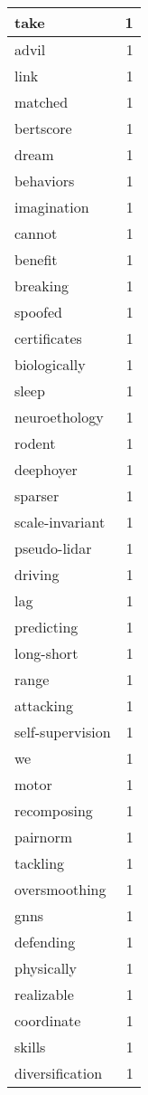 \begin{table}[h]
\begin{tabular}{|l|r|}
\hline
take & 1 \\
\hline
advil & 1 \\
\hline
link & 1 \\
\hline
matched & 1 \\
\hline
bertscore & 1 \\
\hline
dream & 1 \\
\hline
behaviors & 1 \\
\hline
imagination & 1 \\
\hline
cannot & 1 \\
\hline
benefit & 1 \\
\hline
breaking & 1 \\
\hline
spoofed & 1 \\
\hline
certificates & 1 \\
\hline
biologically & 1 \\
\hline
sleep & 1 \\
\hline
neuroethology & 1 \\
\hline
rodent & 1 \\
\hline
deephoyer & 1 \\
\hline
sparser & 1 \\
\hline
scale-invariant & 1 \\
\hline
pseudo-lidar & 1 \\
\hline
driving & 1 \\
\hline
lag & 1 \\
\hline
predicting & 1 \\
\hline
long-short & 1 \\
\hline
range & 1 \\
\hline
attacking & 1 \\
\hline
self-supervision & 1 \\
\hline
we & 1 \\
\hline
motor & 1 \\
\hline
recomposing & 1 \\
\hline
pairnorm & 1 \\
\hline
tackling & 1 \\
\hline
oversmoothing & 1 \\
\hline
gnns & 1 \\
\hline
defending & 1 \\
\hline
physically & 1 \\
\hline
realizable & 1 \\
\hline
coordinate & 1 \\
\hline
skills & 1 \\
\hline
diversification & 1 \\
\hline

\end{tabular}
\end{table}
